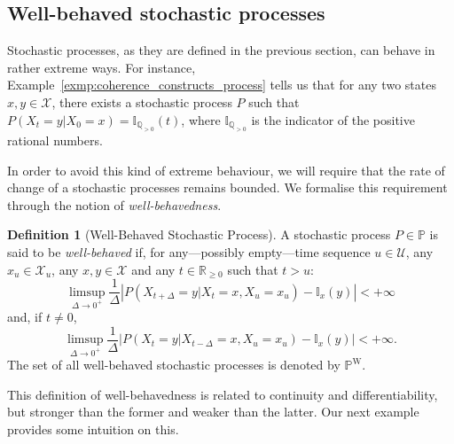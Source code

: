\documentclass[10pt,a4paper]{paper}
\theoremstyle{definition}
\newtheorem{definition}{Definition}
\newcommand{\reals}{\mathbb{R}}
\newcommand{\states}{\mathcal{X}}
\newcommand{\processes}{\mathbb{P}}
\newcommand{\wprocesses}{\processes^{\mathrm{W}}}
\newcommand{\ind}[1]{\mathbb{I}_{#1}}
\newcommand{\abs}[1]{\left\vert #1 \right\vert}
\begin{document}
\subsection{Well-behaved stochastic processes}\label{sec:well_behaved}

Stochastic processes, as they are defined in the previous section, can behave in rather extreme ways. For instance, Example~\ref{exmp:coherence_constructs_process} tells us that for any two states $x,y\in\mathcal{X}$, there exists a stochastic process $P$ such that $P(X_t=y\vert X_0=x)=\ind{\mathbb{Q}_{>0}}(t)$, where $\ind{\mathbb{Q}_{>0}}$ is the indicator of the positive rational numbers.

In order to avoid this kind of extreme behaviour, we will require that the rate of change of a stochastic processes remains bounded. We formalise this requirement through the notion of \emph{well-behavedness}. 


\begin{definition}[Well-Behaved Stochastic Process]
\label{def:well-behaved}
A stochastic process $P\in\processes$ is said to be \emph{well-behaved} if, for any---possibly empty---time sequence $u\in\mathcal{U}$, any $x_u\in\states_u$, any $x,y\in\states$ and any $t\in\reals_{\geq0}$ such that $t>u$:
\begin{equation}\label{eq:def:well-behaved:right}
\limsup_{\Delta\to 0^{+}}\frac{1}{\Delta}\abs{P(X_{t+\Delta}=y\vert X_t=x, X_u=x_u)-\ind{x}(y)}<+\infty
\end{equation}
and, if $t\neq0$,
\begin{equation}\label{eq:def:well-behaved:left}
\limsup_{\Delta\to 0^{+}}\frac{1}{\Delta}\abs{P(X_{t}=y\vert X_{t-\Delta}=x, X_u=x_u)-\ind{x}(y)}<+\infty.
\end{equation}
The set of all well-behaved stochastic processes is denoted by $\wprocesses$.
\end{definition}

This definition of well-behavedness is related to continuity and differentiability, but stronger than the former and weaker than the latter. Our next example provides some intuition on this.
\end{document}

